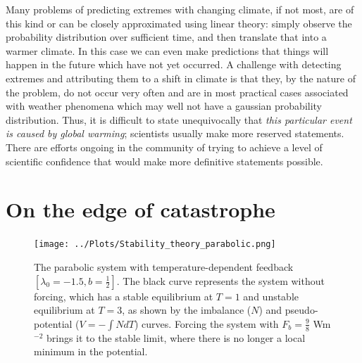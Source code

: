 \documentclass[12pt]{book}
\begin{document}
Many problems of predicting extremes with changing climate, if not most, are of this kind or can be closely approximated using linear theory: simply observe the probability distribution over sufficient time, and then translate that into a warmer climate. In this case we can even make predictions that things will happen in the future which have not yet occurred. 
A challenge with detecting extremes and attributing them to a shift in climate is that they, by the nature of the problem, do not occur very often and are in most practical cases associated with weather phenomena which may well not have a gaussian probability distribution. Thus, it is difficult to state unequivocally that {\em this particular event is caused by global warming}; scientists usually make more reserved statements. There are efforts ongoing in the community of trying to achieve a level of scientific confidence that would make more definitive statements possible. 



\section{On the edge of catastrophe}
\label{sec:ontheedge}

\begin{figure}
	\begin{center}
		\texttt{[image: ../Plots/Stability\_theory\_parabolic.png]}
	\end{center}
	\caption{The parabolic system with temperature-dependent feedback $[\lambda_0 = -1.5, b= \frac{1}{2}]$. The black curve represents the system without forcing, which has a stable equilibrium at $T=1$ and unstable equilibrium at $T=3$, as shown by the imbalance ($N$) and pseudo-potential ($V = -\int N dT$) curves. Forcing the system with $F_b = \frac{9}{8}$ Wm$^{-2}$ brings it to the stable limit, where there is no longer a local minimum in the potential.} 
	\label{fig:parabolic_theory}
\end{figure}
\end{document}
